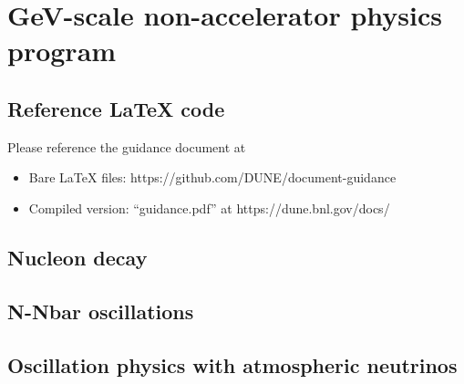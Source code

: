 \chapter{GeV-scale non-accelerator physics program}
\label{ch:nonaccel}


\section{Reference LaTeX code}

Please reference the guidance document at 

\begin{itemize}
\item Bare LaTeX files: https://github.com/DUNE/document-guidance
\item Compiled version: ``guidance.pdf'' at https://dune.bnl.gov/docs/
\end{itemize}


\section{Nucleon decay}
\label{sec:nonaccel-ndk}


\section{N-Nbar oscillations}
\label{sec:nonaccel-nnbar}


\section{Oscillation physics with atmospheric neutrinos}
\label{sec:nonaccel-atm}


